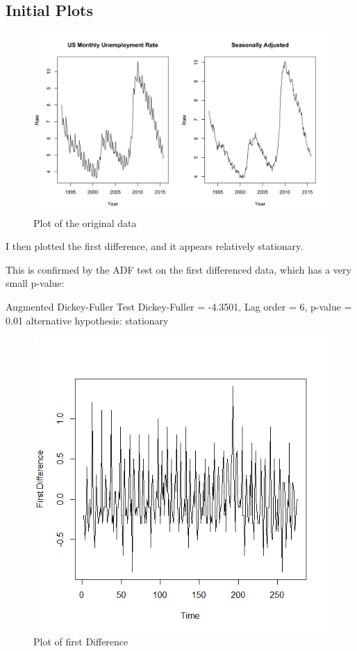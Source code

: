 	
	\subsection{Initial Plots}
	
			
\begin{figure}[H]
\centering
\caption{Plot of the original data}
\label{fig:unemployment}
\includegraphics[width=\linewidth]{images/Unemployment}
\end{figure}

			
			\begin{multicols}{2}
						I then plotted the first difference, and it appears relatively stationary.
						
							This is confirmed by the ADF test on the first differenced data, which has a very small p-value:
						
						Augmented Dickey-Fuller Test
						Dickey-Fuller = -4.3501, Lag order = 6, p-value = 0.01
						alternative hypothesis: stationary
						
						\begin{figure}[H]
							\centering
							\includegraphics[width=.6\linewidth]{images/firstdiff}
							\caption{Plot of first Difference}
							\label{fig:firstdiff}
						\end{figure}
			\end{multicols}

